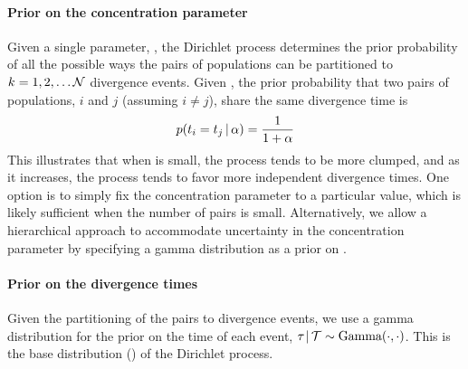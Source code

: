 \begin{linenomath}
\paragraph{Prior on the concentration parameter}
Given a single parameter, \concentration, the Dirichlet process determines the
prior probability of all the possible ways the \ncomparisons{} pairs of
populations can be partitioned to $\nevents = 1, 2, \ldots \ncomparisons$
divergence events.
Given \concentration, the prior probability that two pairs of populations, $i$
and $j$ (assuming $i \neq j$), share the same divergence time is
\begin{equation}
    \pr(\comparisondivtime[i] = \comparisondivtime[j] \given \concentration)
    =
    \frac{1}{1 + \concentration}
\end{equation}
This illustrates that when \concentration is small, the process tends to be
more clumped, and as it increases, the process tends to favor more independent
divergence times.
One option is to simply fix the concentration parameter to a particular value,
which is likely sufficient when the number of pairs is small.
Alternatively, we allow a hierarchical approach to accommodate uncertainty in
the concentration parameter by specifying a gamma distribution as a prior on
\concentration \citep{Escobar1995,Heath2011}.
\end{linenomath}

\paragraph{Prior on the divergence times}
Given the partitioning of the pairs to divergence events, we use a gamma
distribution for the prior on the time of each event,
$\divtime \given \divtimesets \sim \distgamma(\cdot, \cdot)$.
This is the base distribution (\basedistribution) of the Dirichlet process.

